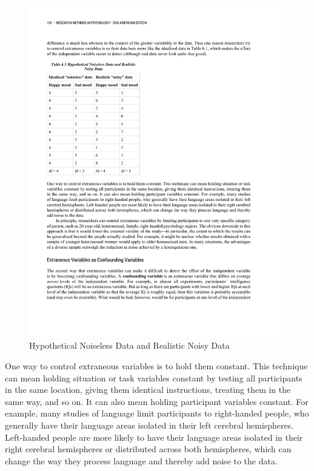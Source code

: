 \begin{figure}[0in]
\includegraphics[width=\linewidth]{figures/C6noisydata.pdf}
\caption{Hypothetical Noiseless Data and Realistic Noisy Data}
\label{fig:noisydata}
\end{figure}

One way to control extraneous variables is to hold them constant. This technique can mean holding situation or task variables constant by testing all participants in the same location, giving them identical instructions, treating them in the same way, and so on. It can also mean holding participant variables constant. For example, many studies of language limit participants to right-handed people, who generally have their language areas isolated in their left cerebral hemispheres. Left-handed people are more likely to have their language areas isolated in their right cerebral hemispheres or distributed across both hemispheres, which can change the way they process language and thereby add noise to the data.

